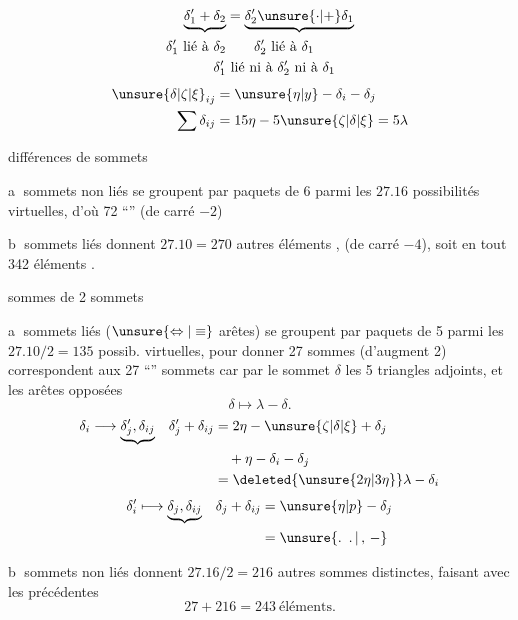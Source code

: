 \[
\begin{aligned}
\underbrace{\delta'_1+\delta_2}&=\underbrace{\delta'_2\unsure{\cdot|+}\delta_1}\\
\delta'_1\ \text{lié à }\delta_2 &\qquad \delta'_2\ \text{lié à }\delta_1\\
\delta'_1&\ \text{lié ni à }\delta'_2\ \text{ni à }\delta_1
\end{aligned}
\]
\[
\begin{aligned}
\unsure{\delta|\zeta|\xi}_{ij}&=\unsure{\eta|y}-\delta_i-\delta_j\\
\sum\delta_{ij}&=15\eta-5\unsure{\zeta|\delta|\xi}=5\lambda
\end{aligned}
\]

différences de sommets

\textcircled{a} sommets non liés se groupent par paquets de 6 parmi les $27.16$ possibilités virtuelles, d'où 72 ``'' (de carré $-2$)

\textcircled{b} sommets liés donnent $27.10=270$ autres éléments ,   (de carré $-4$), soit en tout 342 éléments .

sommes de 2 sommets

\textcircled{a} sommets  liés ($\unsure{\Leftrightarrow|\equiv}$ arêtes) se groupent par paquets de 5 parmi les  $27.10/2=135$ possib. virtuelles, pour donner 27 sommes (d'augment 2) correspondent aux 27 ``'' sommets car  par le sommet $\delta$ les 5  triangles adjoints, et les arêtes opposées
\[
\delta\longmapsto\lambda-\delta.
\]
\[
\begin{aligned}
\delta_i&\longrightarrow\underbrace{\delta'_j,\delta_{ij}}&
\delta'_j+\delta_{ij}&=2\eta-\unsure{\zeta|\delta|\xi}+\delta_j\\
&&&\quad{}+\eta-\delta_i-\delta_j\\
&&&=\deleted{\unsure{2\eta|3\eta}}\lambda-\delta_i
\end{aligned}
\]
\[
\begin{aligned}
\delta'_i &\longmapsto\underbrace{\delta_j,\delta_{ij}}&
\delta_j+\delta_{ij}&=\unsure{\eta|p}-\delta_j\\
&&&=\unsure{\ldotp\ \ldotp|\, ,\, -}
\end{aligned}
\]

\textcircled{b}  sommets non liés  donnent $27.16/2=216$ autres sommes distinctes, faisant avec les précédentes
\[
27+216=243\ \text{éléments.}
\]

